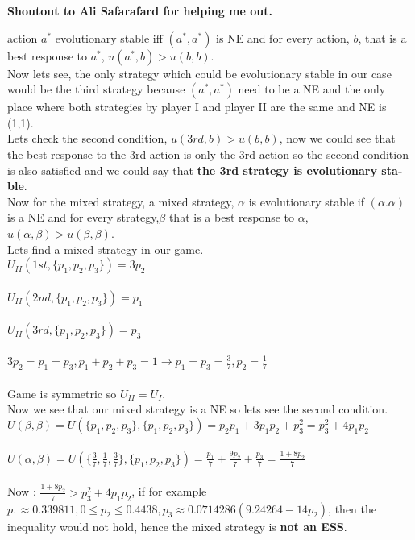 
\begin{latin}
    \begin{center}
    \noindent
    \textbf{Shoutout to Ali Safarafard for helping me out.} \\
    \end{center}

\end{latin}
\begin{latin}
    \noindent
    action $a^*$ evolutionary stable iff $(a^*,a^*)$ is NE and for every action, $b$, that is a best response to $a^*$, $u(a^*,b)>u(b,b)$.
    \\
    Now lets see, the only strategy which could be evolutionary stable in our case would be the third strategy because $(a^*,a^*)$ need to be a NE and the only place where both strategies by player I and player II are the same and NE is (1,1).\\
    Lets check the second condition, $u(3rd,b) > u(b,b)$, now we could see that the best response to the 3rd action is only the 3rd action so the second condition is also satisfied and we could say that \textbf{the 3rd strategy is evolutionary stable}.\\
    Now for the mixed strategy, a mixed strategy, $\alpha$ is evolutionary stable if $(\alpha.\alpha)$ is a NE and for every strategy,$\beta$ that is a best response to $\alpha$, $u(\alpha,\beta) > u(\beta,\beta)$.
    \\
    Lets find a mixed strategy in our game.\\
    $U_{II}(1st,\{p_1,p_2,p_3\}) = 3p_2$\\\\
    $U_{II}(2nd,\{p_1,p_2,p_3\}) = p_1$\\\\
    $U_{II}(3rd,\{p_1,p_2,p_3\}) = p_3$\\\\
    $3p_2 = p_1 = p_3 , p_1+p_2+p_3 = 1 \rightarrow p_1=p_3 = \frac{3}{7},p_2 = \frac{1}{7}$\\\\
    Game is symmetric so $U_{II} = U_I$. \\
    Now we see that our mixed strategy is a NE so lets see the second condition. \\
    $U(\beta,\beta) = U(\{p_1,p_2,p_3\},\{p_1,p_2,p_3\}) = p_2p_1+3p_1p_2+p_3^2=p_3^2+4p_1p_2$ \\\\
    $U(\alpha,\beta) = U(\{\frac{3}{7},\frac{1}{7},\frac{3}{7}\},\{p_1,p_2,p_3\})= \frac{p_1}{7}+\frac{9p_2}{7}+\frac{p_3}{7}=\frac{1+8p_2}{7}$ \\\\
    Now : $\frac{1+8p_2}{7} > p_3^2+4p_1p_2$, if for example $p_1\approx 0.339811, 0\leq p_2\leq 0.4438, p_3 \approx 0.0714286 (9.24264 - 14 p_2)$, then the inequality would not hold, hence the mixed strategy is \textbf{not an ESS}.
\end{latin}









